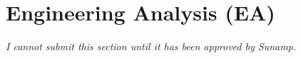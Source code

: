 
\section{Engineering Analysis (EA)} \label{EA}

\emph{I cannot submit this section until it has been approved by Sunamp.}





\begin{comment}

\subsection*{EA1(i, b, m)}

Conducting laboratory experiments and modelling exercises in \textit{Energy Principles and Applications}, \textit{Design Software Applications}, \textit{Thermal Performance Studies} and \textit{Laboratory Project} further developed my skills in monitoring, interpreting and applying the results of analysis to bring about continuous improvement (EA1i).
\textit{Laboratory Project} went a step further and taught me the principles and process to engineering a better solution (EA1b and EA1m).
These principles were applied in an engineering project which aimed to optimise the design of a cooling coil.
\hl{Analysis of key engineering processes???}





\subsection*{EA2(i, -)}

A range of courses have developed my ability to understand and explain the performance of systems and components through the use of quantitative/ analytical methods and/ or modelling techniques:
\textit{Construction Technology 2},
\textit{Acoustics and Architectural Design},
\textit{Hydraulics and Hydrology A},
\textit{Energy Principles and Applications},
\textit{Thermal Performance Studies},
\textit{Laboratory Project},
and \textit{Design Project}.
For example, in \textit{Hydraulics and Hydrology A}, I learned how to use quantitative methods to distinguish laminar flows from turbulent flows.
And when we were studying thermofluids in \textit{Laboratory Project}, I used both CFD modelling and analytical methods to understand and describe the performance of a cooling coil in an air conditioning unit.


\end{comment}
